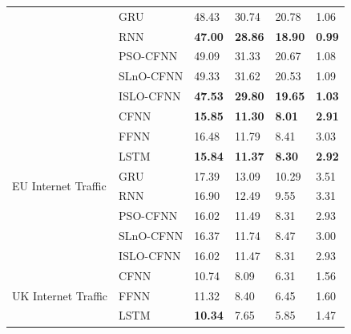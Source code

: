 \documentclass[a4paper,13pt,2p]{report}
\begin{document}
\begin{table}[!t]
\begin{tabular}{|l|l|l|l|l|l|}
                                     & GRU       & 48.43           & 30.74           & 20.78          & 1.06          \\ \cline{2-6} 
                                     & RNN       & \textbf{47.00}  & \textbf{28.86}  & \textbf{18.90} & \textbf{0.99} \\ \cline{2-6} 
                                     & PSO-CFNN  & 49.09           & 31.33           & 20.67          & 1.08          \\ \cline{2-6} 
                                     & SLnO-CFNN & 49.33           & 31.62           & 20.53          & 1.09          \\ \cline{2-6} 
                                     & ISLO-CFNN & \textbf{47.53}  & \textbf{29.80}  & \textbf{19.65} & \textbf{1.03} \\ \hline
\multirow{8}{*}{EU Internet Traffic} & CFNN      & \textbf{15.85}  & \textbf{11.30}  & \textbf{8.01}  & \textbf{2.91} \\ \cline{2-6} 
                                     & FFNN      & 16.48           & 11.79           & 8.41           & 3.03          \\ \cline{2-6} 
                                     & LSTM      & \textbf{15.84}  & \textbf{11.37}  & \textbf{8.30}  & \textbf{2.92} \\ \cline{2-6} 
                                     & GRU       & 17.39           & 13.09           & 10.29          & 3.51          \\ \cline{2-6} 
                                     & RNN       & 16.90           & 12.49           & 9.55           & 3.31          \\ \cline{2-6} 
                                     & PSO-CFNN  & 16.02           & 11.49           & 8.31           & 2.93          \\ \cline{2-6} 
                                     & SLnO-CFNN & 16.37           & 11.74           & 8.47           & 3.00          \\ \cline{2-6} 
                                     & ISLO-CFNN & 16.02           & 11.47           & 8.31           & 2.93          \\ \hline
\multirow{8}{*}{UK Internet Traffic} & CFNN      & 10.74           & 8.09            & 6.31           & 1.56          \\ \cline{2-6} 
                                     & FFNN      & 11.32           & 8.40            & 6.45           & 1.60          \\ \cline{2-6} 
                                     & LSTM      & \textbf{10.34}  & 7.65            & 5.85           & 1.47          \\ \cline{2-6} 

\end{tabular}
\end{table}
\end{document}
